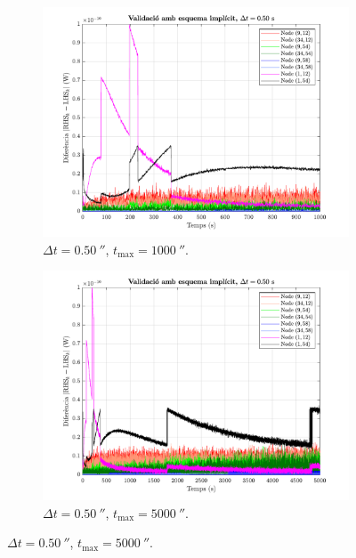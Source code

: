 \begin{figure}[ht]
	\centering
	\begin{subfigure}{.5\textwidth}
		\centering
		\includegraphics[width=.95\linewidth]{imagenes/03_validacio/validacio_07.pdf}
		\vspace{-7pt}
		\caption{$\Delta t = 0.50 \ \second$, $t_\text{max} = 1000 \ \second$.}
		\label{fig:validacio_07}
	\end{subfigure}%
	\begin{subfigure}{.5\textwidth}
		\centering
		\includegraphics[width=.95\linewidth]{imagenes/03_validacio/validacio_08.pdf}
		\vspace{-7pt}
		\caption{$\Delta t = 0.50 \ \second$, $t_\text{max} = 5000 \ \second$.}
		\label{fig:validacio_08}

\end{subfigure}
\end{figure}

